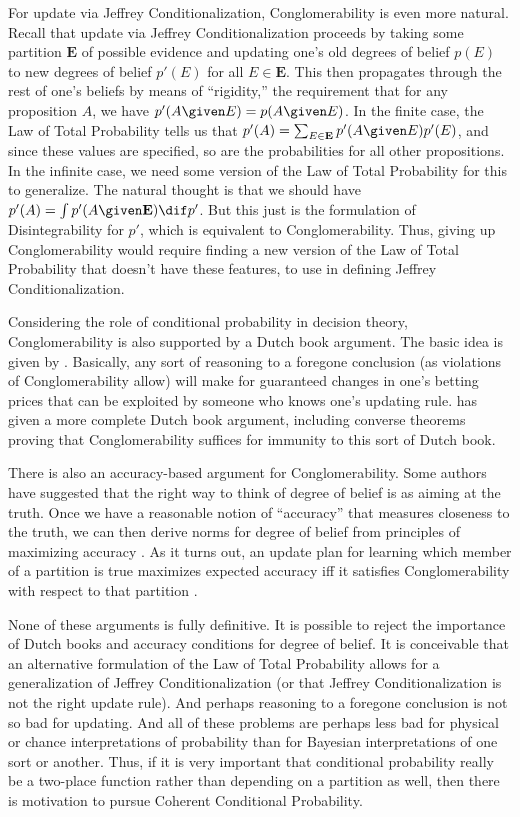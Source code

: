 For update via Jeffrey Conditionalization, Conglomerability is even more natural. Recall that update via Jeffrey Conditionalization proceeds by taking some partition $\mathbf{E}$ of possible evidence and updating one's old degrees of belief $p(E)$ to new degrees of belief $p'(E)$ for all $E\in \mathbf{E}$. This then propagates through the rest of one's beliefs by means of ``rigidity,'' the requirement that for any proposition $A$, we have $p'(A \given E)=p(A \given E)$. In the finite case, the Law of Total Probability tells us that ${p'(A)=\sum_{E\in\mathbf{E}}p'(A \given E)p'(E)}$, and since these values are specified, so are the probabilities for all other propositions. In the infinite case, we need some version of the Law of Total Probability for this to generalize. The natural thought is that we should have $p'(A)=\int p'(A \given \mathbf{E}) \dif p'$. But this just is the formulation of Disintegrability for $p'$, which is equivalent to Conglomerability. Thus, giving up Conglomerability would require finding a new version of the Law of Total Probability that doesn't have these features, to use in defining Jeffrey Conditionalization.

Considering the role of conditional probability in decision theory, Conglomerability is also supported by a Dutch book argument. The basic idea is given by \citet[p.\ 431]{billingsley}. Basically, any sort of reasoning to a foregone conclusion (as violations of Conglomerability allow) will make for guaranteed changes in one's betting prices that can be exploited by someone who knows one's updating rule.  \citet{rescorlaconglom} has given a more complete Dutch book argument, including converse theorems proving that Conglomerability suffices for immunity to this sort of Dutch book.

There is also an accuracy-based argument for Conglomerability. Some authors have suggested that the right way to think of degree of belief is as aiming at the truth. Once we have a reasonable notion of ``accuracy'' that measures closeness to the truth, we can then derive norms for degree of belief from principles of maximizing accuracy \citep{nonprag,grvwlc,pettbook}. As it turns out, an update plan for learning which member of a partition is true maximizes expected accuracy iff it satisfies Conglomerability with respect to that partition \citep{expectacc}.

None of these arguments is fully definitive. It is possible to reject the importance of Dutch books and accuracy conditions for degree of belief. It is conceivable that an alternative formulation of the Law of Total Probability allows for a generalization of Jeffrey Conditionalization (or that Jeffrey Conditionalization is not the right update rule). And perhaps reasoning to a foregone conclusion is not so bad for updating. And all of these problems are perhaps less bad for physical or chance interpretations of probability than for Bayesian interpretations of one sort or another. Thus, if it is very important that conditional probability really be a two-place function rather than depending on a partition as well, then there is motivation to pursue Coherent Conditional Probability.

